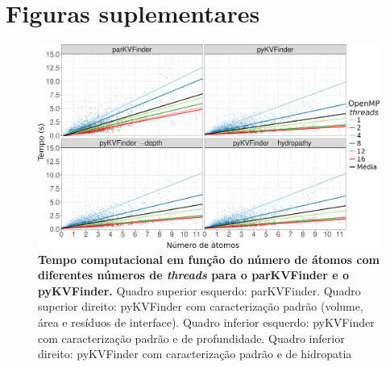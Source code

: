 \documentclass[Portugues]{phdquali}
\begin{document}



\chapter{Figuras suplementares \label{ap:figuras-suplementares}}

\begin{figure}[htb]
  \centering
  \includegraphics[scale=0.46]{images/pykvfinder-parkvfinder-kv1000-comparison.png}
  \caption[Ganho de velocidade do pyKVFinder comparado ao parKVFinder]{\textbf{Tempo computacional em função do número de átomos com diferentes números de \textit{threads} para o parKVFinder e o pyKVFinder.} Quadro superior esquerdo: parKVFinder. Quadro superior direito: pyKVFinder com caracterização padrão (volume, área e resíduos de interface). Quadro inferior esquerdo: pyKVFinder com caracterização padrão e de profundidade. Quadro inferior direito: pyKVFinder com caracterização padrão e de hidropatia}
  \label{fig:pykvfinder-parkvfinder-kv1000-comparison}
\end{figure}
\end{document}
